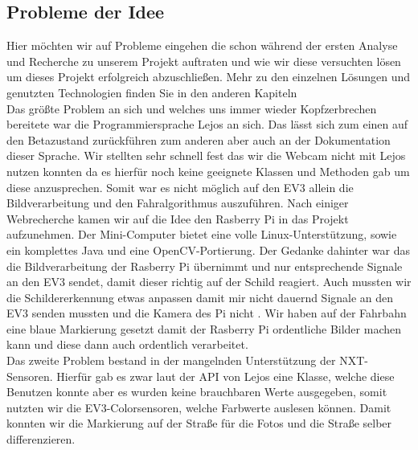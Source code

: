\subsection{Probleme der Idee}
Hier möchten wir auf Probleme eingehen die schon während der ersten Analyse und Recherche zu unserem Projekt auftraten und wie wir diese versuchten lösen um dieses Projekt erfolgreich abzuschließen. Mehr zu den einzelnen Lösungen und genutzten Technologien finden Sie in den anderen Kapiteln\\
Das größte Problem an sich und welches uns immer wieder Kopfzerbrechen bereitete war die Programmiersprache Lejos an sich. Das lässt sich zum einen auf den Betazustand zurückführen zum anderen aber auch an der Dokumentation dieser Sprache. Wir stellten sehr schnell fest das wir die Webcam nicht mit Lejos nutzen konnten da es hierfür noch keine geeignete Klassen und Methoden gab um diese anzusprechen. Somit war es nicht möglich auf den EV3 allein die Bildverarbeitung und den Fahralgorithmus auszuführen. Nach einiger Webrecherche  kamen wir auf die Idee den Rasberry Pi in das Projekt aufzunehmen. Der Mini-Computer bietet eine volle Linux-Unterstützung, sowie ein komplettes Java und eine OpenCV-Portierung. Der Gedanke dahinter war das die Bildverarbeitung der Rasberry Pi übernimmt und nur entsprechende Signale an den EV3 sendet, damit dieser richtig auf der Schild reagiert. Auch mussten wir die Schildererkennung etwas anpassen damit mir nicht dauernd Signale an den EV3 senden mussten und die Kamera des Pi nicht . Wir haben auf der Fahrbahn eine blaue Markierung gesetzt damit der Rasberry Pi ordentliche Bilder machen kann und diese dann auch ordentlich verarbeitet.\\
Das zweite Problem bestand in der mangelnden Unterstützung der NXT-Sensoren. Hierfür gab es zwar laut der API von Lejos eine Klasse, welche diese Benutzen konnte aber es wurden keine brauchbaren Werte ausgegeben, somit nutzten wir die EV3-Colorsensoren, welche Farbwerte auslesen können. Damit konnten wir die Markierung auf der Straße für die Fotos und die Straße selber differenzieren.

